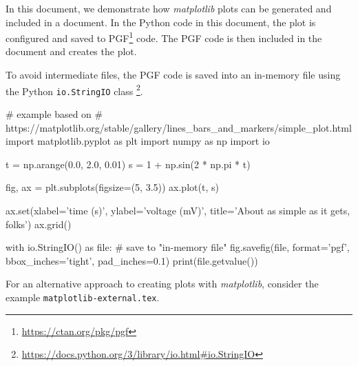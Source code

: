 \documentclass{article}
\begin{document}
In this document, we demonstrate how \emph{matplotlib} plots can be generated
and included in a document. In the Python code in this document, the plot is
configured and saved to PGF\footnote{\url{https://ctan.org/pkg/pgf}} code.
The PGF code is then included in the document and creates the plot.

To avoid intermediate files, the PGF code is saved into an in-memory file
using the Python \verb|io.StringIO| class%
\footnote{\url{https://docs.python.org/3/library/io.html#io.StringIO}}.

\begin{center}
\begin{python}
# example based on
# https://matplotlib.org/stable/gallery/lines_bars_and_markers/simple_plot.html
import matplotlib.pyplot as plt
import numpy as np
import io

t = np.arange(0.0, 2.0, 0.01)
s = 1 + np.sin(2 * np.pi * t)

fig, ax = plt.subplots(figsize=(5, 3.5))
ax.plot(t, s)

ax.set(xlabel='time (s)', ylabel='voltage (mV)',
       title='About as simple as it gets, folks')
ax.grid()

with io.StringIO() as file:  # save to "in-memory file"
  fig.savefig(file, format='pgf', bbox_inches='tight', pad_inches=0.1)
  print(file.getvalue())
\end{python}
\end{center}

For an alternative approach to creating plots with \emph{matplotlib},
consider the example \verb|matplotlib-external.tex|.
\end{document}
